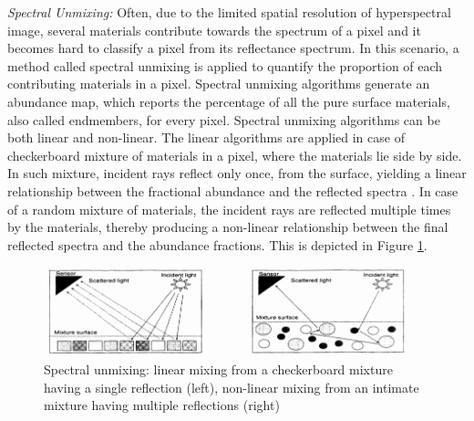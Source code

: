 \documentclass[12pt,twoside]{article}
\theoremstyle{plain}
\theoremstyle{definition}
\theoremstyle{remark}
\newcommand{\forceindent}{\leavevmode{\parindent=2em\indent}}
\begin{document}
\forceindent \textit{Spectral Unmixing:} Often, due to the limited spatial resolution of hyperspectral image, several materials contribute towards the spectrum of a pixel and it becomes hard to classify a pixel from its reflectance spectrum. In this scenario, a method called spectral unmixing is applied to quantify the proportion of each contributing materials in a pixel. Spectral unmixing algorithms generate an abundance map, which reports the percentage of all the pure surface materials, also called endmembers, for every pixel. Spectral unmixing algorithms can be both linear and non-linear. The linear algorithms are applied in case of  checkerboard mixture of materials in a pixel, where the materials lie side by side. In such mixture, incident rays reflect only once, from the surface, yielding a linear relationship between the fractional abundance and the reflected spectra \cite{keshava2000algorithm}. In case of a random mixture of materials, the incident rays are reflected multiple times by the materials, thereby producing a non-linear relationship between the final reflected spectra and the abundance fractions. This is depicted in Figure \ref{fig:unmix}.
\begin{figure}[hbtp]
\centering
\includegraphics[width=0.95\textwidth]{src/spectral_unmixing.png}
\caption{Spectral unmixing: linear mixing from a checkerboard mixture having a single reflection (left), non-linear mixing from an intimate mixture having multiple reflections (right) \cite{keshava2000algorithm}}
\label{fig:unmix}
\end{figure}
\end{document}
